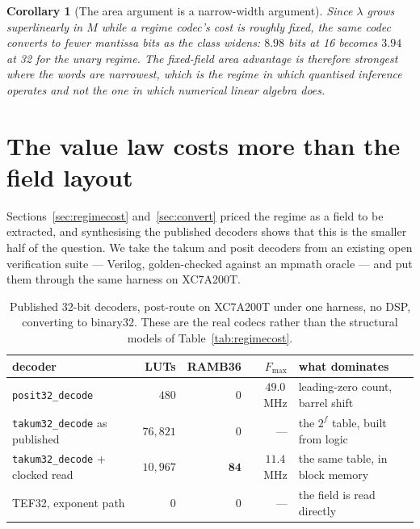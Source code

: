 \documentclass[11pt]{article}
\newtheorem{corollary}{Corollary}
\theoremstyle{definition}
\begin{document}
\begin{corollary}[The area argument is a narrow-width argument]
\label{cor:narrow}
Since $\lambda$ grows superlinearly in $M$ while a regime codec's cost is roughly
fixed, the same codec converts to fewer mantissa bits as the class widens:
$8.98$ bits at 16 becomes $3.94$ at 32 for the unary regime. The fixed-field area
advantage is therefore strongest where the words are narrowest, which is the
regime in which quantised inference operates and not the one in which numerical
linear algebra does.
\end{corollary}


\section{The value law costs more than the field layout}
\label{sec:valuelaw}

Sections~\ref{sec:regimecost} and~\ref{sec:convert} priced the regime as a field
to be extracted, and synthesising the published decoders shows that this is the
smaller half of the question. We take the takum and posit decoders from an
existing open verification suite --- Verilog, golden-checked against an mpmath
oracle --- and put them through the same harness on XC7A200T.

\begin{table}[t]\centering
\caption{Published 32-bit decoders, post-route on XC7A200T under one harness, no
DSP, converting to binary32. These are the real codecs rather than the structural
models of Table~\ref{tab:regimecost}.}
\label{tab:realcodecs}
\begin{tabular}{lrrrl}
\toprule
decoder & LUTs & RAMB36 & $F_{\max}$ & what dominates \\
\midrule
\texttt{posit32\_decode}          & $480$      & $0$  & $49.0$\,MHz & leading-zero count, barrel shift \\
\texttt{takum32\_decode} as published & $76{,}821$ & $0$  & ---         & the $2^{f}$ table, built from logic \\
\texttt{takum32\_decode} + clocked read & $10{,}967$ & $\mathbf{84}$ & $11.4$\,MHz & the same table, in block memory \\
TEF32, exponent path             & $0$        & $0$  & ---         & the field is read directly \\
\bottomrule
\end{tabular}
\end{table}
\end{document}
